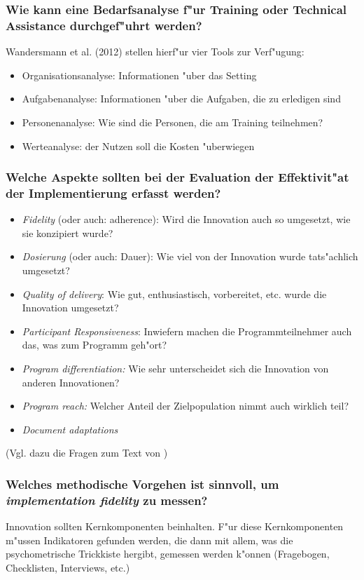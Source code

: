 \subsubsection{Wie kann eine Bedarfsanalyse f"ur Training oder Technical Assistance durchgef"uhrt werden?}
Wandersmann et al. (2012) stellen hierf"ur vier Tools zur Verf"ugung:
\begin{itemize}
        \item Organisationsanalyse: Informationen "uber das Setting
        \item Aufgabenanalyse: Informationen "uber die Aufgaben, die zu erledigen sind
        \item Personenanalyse: Wie sind die Personen, die am Training teilnehmen?
        \item Werteanalyse: der Nutzen soll die Kosten "uberwiegen
\end{itemize}

\subsubsection{Welche Aspekte sollten bei der Evaluation der Effektivit"at der Implementierung erfasst werden?}
\begin{itemize}
        \item \emph{Fidelity} (oder auch: adherence): Wird die Innovation auch so umgesetzt, wie sie konzipiert wurde?
        \item \emph{Dosierung} (oder auch: Dauer): Wie viel von der Innovation wurde tats"achlich umgesetzt?
        \item \emph{Quality of delivery}: Wie gut, enthusiastisch, vorbereitet, etc. wurde die Innovation umgesetzt?
        \item \emph{Participant Responsiveness}: Inwiefern machen die Programmteilnehmer auch das, was zum Programm geh"ort?
        \item \emph{Program differentiation:} Wie sehr unterscheidet sich die Innovation von anderen Innovationen?
        \item \emph{Program reach:} Welcher Anteil der Zielpopulation nimmt auch wirklich teil?
        \item \emph{Document adaptations}
\end{itemize}

(Vgl. dazu die Fragen zum Text von \textcite{fagan_translational_2009})

\subsubsection{Welches methodische Vorgehen ist sinnvoll, um \emph{implementation fidelity} zu messen?}
Innovation sollten Kernkomponenten beinhalten. F"ur diese Kernkomponenten m"ussen Indikatoren gefunden werden, die dann mit allem, was die psychometrische Trickkiste hergibt, gemessen werden k"onnen (Fragebogen, Checklisten, Interviews, etc.)
